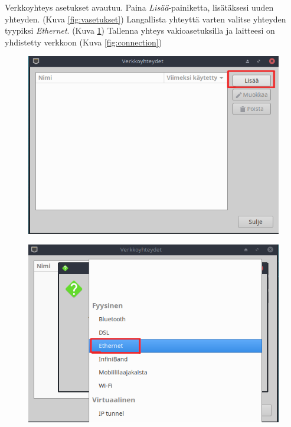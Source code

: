 \documentclass[a4paper, 12pt, finnish]{article}
\begin{document}
Verkkoyhteys asetukset avautuu. Paina \textit{Lisää}-painiketta, lisätäksesi uuden yhteyden. (Kuva \ref{fig:vasetukset}) Langallista yhteyttä varten valitse yhteyden tyypiksi \textit{Ethernet}. (Kuva \ref{fig:ethernet})
Tallenna yhteys vakioasetuksilla ja laitteesi on yhdistetty verkkoon (Kuva \ref{fig:connection})

\begin{figure}[htbp]
     \centering
      \begin{minipage}{.5\textwidth}
           \centering
            \includegraphics[width=.98\linewidth]{internet/lisaa_yhteys}
              \label{fig:vasetukset}
               \end{minipage}%
               \begin{minipage}{.5\textwidth}
                    \centering
                     \includegraphics[width=.98\linewidth]{internet/yhteys_ethernet}
                       \label{fig:ethernet}
                        \end{minipage}
                         \end{figure}
                         \clearpage
\end{document}

